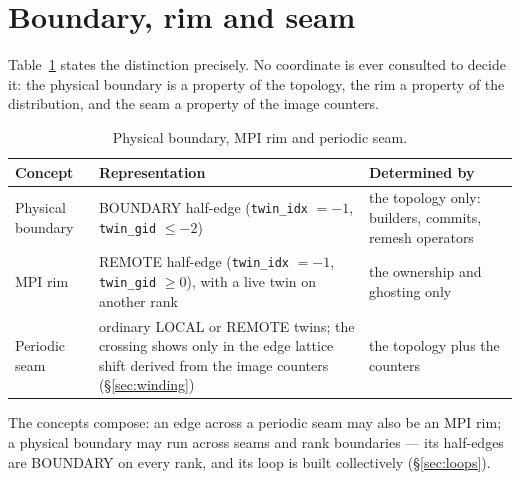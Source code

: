 \section{Boundary, rim and seam}
\label{sec:bound-rim-seam}

Table~\ref{tab:brs} states the distinction precisely. No coordinate is ever consulted to decide
it: the physical boundary is a property of the topology, the rim a property of the
distribution, and the seam a property of the image counters.

\begin{table}[ht]
\centering\small
\begin{tabularx}{\textwidth}{@{}lXX@{}}
\toprule
Concept & Representation & Determined by \\
\midrule
Physical boundary & BOUNDARY half-edge (\texttt{twin\_idx} $=-1$, \texttt{twin\_gid} $\le -2$) & the topology only: builders, commits, remesh operators \\
MPI rim & REMOTE half-edge (\texttt{twin\_idx} $=-1$, \texttt{twin\_gid} $\ge0$), with a live twin on another rank & the ownership and ghosting only \\
Periodic seam & ordinary LOCAL or REMOTE twins; the crossing shows only in the edge lattice shift derived from the image counters (\S\ref{sec:winding}) & the topology plus the counters \\
\bottomrule
\end{tabularx}
\caption{Physical boundary, MPI rim and periodic seam.}
\label{tab:brs}
\end{table}

The concepts compose: an edge across a periodic seam may also be an MPI rim; a physical
boundary may run across seams and rank boundaries --- its half-edges are BOUNDARY on every rank,
and its loop is built collectively (\S\ref{sec:loops}).

